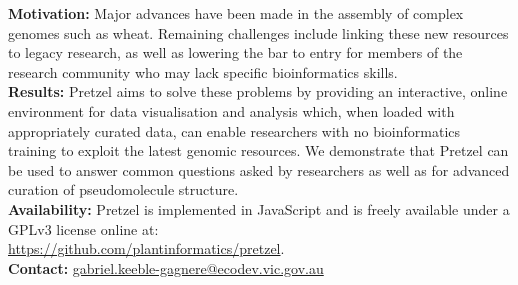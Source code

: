\textbf{Motivation:}
Major advances have been made in the assembly of complex genomes such as wheat. Remaining challenges
include linking these new resources to legacy research, as well as lowering the bar to entry for
members of the research community who may lack specific bioinformatics skills. 
\\
\textbf{Results:} 
Pretzel aims to solve these problems by providing an interactive, online environment for data visualisation and analysis which, when loaded with appropriately curated data, can enable researchers with no bioinformatics training to exploit the latest genomic resources. 
We demonstrate that Pretzel can be used to answer common questions asked by researchers as well as for advanced curation of pseudomolecule structure.
\\
\textbf{Availability:} 
Pretzel is implemented in JavaScript and is freely available under a GPLv3 license online at: 
\\
\href{https://github.com/plantinformatics/pretzel}{https://github.com/plantinformatics/pretzel}.
\\
\textbf{Contact:}
\href{gabriel.keeble-gagnere@ecodev.vic.gov.au}{gabriel.keeble-gagnere@ecodev.vic.gov.au}\\
